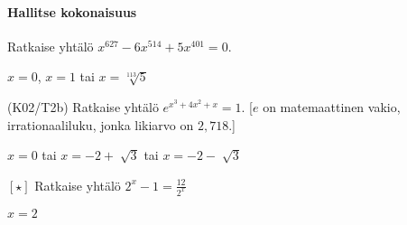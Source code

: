 \begin{tehtavasivu}
\paragraph*{Hallitse kokonaisuus}

\begin{tehtava}
	Ratkaise yhtälö $x^{627} - 6x^{514} + 5x^{401} = 0$.
	\begin{vastaus}
		$x = 0$, $x = 1$ tai $x = \sqrt[113]{5}$
	\end{vastaus}
\end{tehtava}

\begin{tehtava}
	(K02/T2b) Ratkaise yhtälö $e^{x^3+4x^2+x}=1$. [$e$ on matemaattinen vakio, irrationaaliluku, jonka likiarvo on $2,718$.]
	\begin{vastaus}
	$x=0$ tai $x=-2 + \sqrt[]{3}$ tai $x=-2 - \sqrt[]{3}$
	\end{vastaus}
\end{tehtava}

\begin{tehtava}
	$[ \star ]$ Ratkaise yhtälö $2^x-1=\frac{12}{2^x}$
	\begin{vastaus}
	$x=2$
	\end{vastaus}
\end{tehtava}

\end{tehtavasivu}
